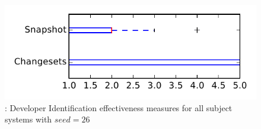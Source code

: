 
\begin{figure}
\centering
\includegraphics[height=0.4\textheight]{figures/dit_seed/rq1_tiny_26}
\caption{\rtwo: Developer Identification effectiveness measures for all subject systems with $seed=26$}
\label{fig:dit_seed:rq1:tiny}
\end{figure}

